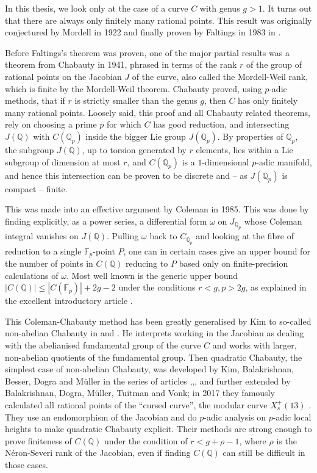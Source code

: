 \documentclass[12pt]{article}
\newcommand{\Q}{\mathbb{Q}}
\newcommand{\F}{\mathbb{F}}
\theoremstyle{plain}
\theoremstyle{definition}
\theoremstyle{remark}
\begin{document}
In this thesis, we look only at the case of a curve $C$ with genus $g > 1$. It turns out that there are always only finitely many rational points. This result was originally conjectured by Mordell in 1922 and finally proven by Faltings in 1983 in \cite{faltings}.

Before Faltings's theorem was proven, one of the major partial results was a theorem from Chabauty in 1941, phrased in terms of the rank $r$ of the group of rational points on the Jacobian $J$ of the curve, also called the Mordell-Weil rank, which is finite by the Mordell-Weil theorem. Chabauty proved, using $p$-adic methods, that if $r$ is strictly smaller than the genus $g$, then $C$ has only finitely many rational points. Loosely said, this proof and all Chabauty related theorems, rely on choosing a prime $p$ for which $C$ has good reduction, and intersecting $J(\Q)$ with $C(\Q_p)$ inside the bigger Lie group $J(\Q_p)$. By properties of $\Q_p$, the subgroup $J(\Q)$, up to torsion generated by $r$ elements, lies within a Lie subgroup of dimension at most $r$, and $C(\Q_p)$ is a $1$-dimensional $p$-adic manifold, and hence this intersection can be proven to be discrete and -- as $J(\Q_p)$ is compact -- finite.

This was made into an effective argument by Coleman in 1985. This was done by finding explicitly, as a power series, a differential form $\omega$ on $J_{\Q_p}$ whose Coleman integral vanishes on $J(\Q)$. Pulling $\omega$ back to $C_{\Q_p}$ and looking at the fibre of reduction to a single $\F_p$-point $P$, one can in certain cases give an upper bound for the number of points in $C(\Q)$ reducing to $P$ based only on finite-precision calculations of $\omega$. Most well known is the generic upper bound $|C(\Q)| \leq |C(\F_p)| + 2g-2$ under the conditions $r < g, p > 2g$, as explained in the excellent introductory article \cite{poonen12}.

This Coleman-Chabauty method has been greatly generalised by Kim to so-called non-abelian Chabauty in \cite{kim1} and \cite{kim2}. He interprets working in the Jacobian as dealing with the abelianised fundamental group of the curve $C$ and works with larger, non-abelian quotients of the fundamental group. Then quadratic Chabauty, the simplest case of non-abelian Chabauty, was developed by Kim, Balakrishnan, Besser, Dogra and M\"uller in the series of articles \cite{qc1},\cite{qc2},\cite{qc3}, and further extended by Balakrishnan, Dogra, M\"uller, Tuitman and Vonk; in 2017 they famously calculated all rational points of the ``cursed curve'', the modular curve $X_s^+(13)$ \cite{cursedcurve}. They use an endomorphism of the Jacobian and do $p$-adic analysis on $p$-adic local heights to make quadratic Chabauty explicit. Their methods are strong enough to prove finiteness of $C(\Q)$ under the condition of $r < g + \rho - 1$, where $\rho$ is the N\'eron-Severi rank of the Jacobian, even if finding $C(\Q)$ can still be difficult in those cases.
\end{document}
